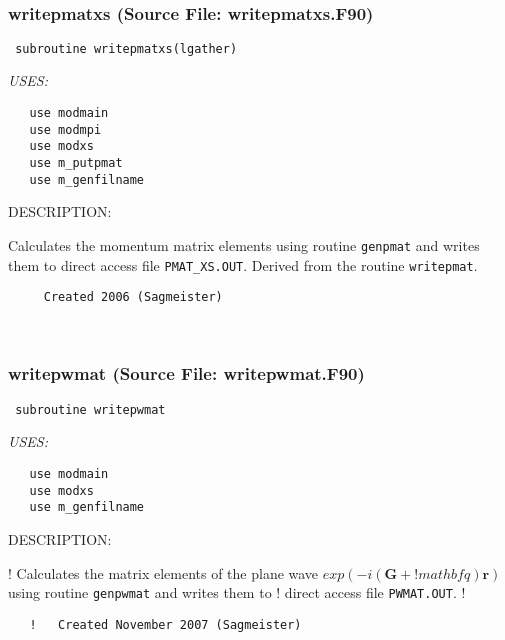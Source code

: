 \documentclass[11pt]{article}
\begin{document}

 
 
\mbox{}\hrulefill\ 
 
\subsubsection{writepmatxs (Source File: writepmatxs.F90)}


\begin{verbatim} subroutine writepmatxs(lgather)\end{verbatim}{\em USES:}
\begin{verbatim}   use modmain
   use modmpi
   use modxs
   use m_putpmat
   use m_genfilname\end{verbatim}
{\sf DESCRIPTION:\\ }


     Calculates the momentum matrix elements using routine {\tt genpmat} and
     writes them to direct access file {\tt PMAT\_XS.OUT}. Derived from
     the routine {\tt writepmat}.
  
\begin{verbatim}     Created 2006 (Sagmeister)\end{verbatim}


 
 
\mbox{}\hrulefill\ 
 
\subsubsection{writepwmat (Source File: writepwmat.F90)}


\begin{verbatim} subroutine writepwmat\end{verbatim}{\em USES:}
\begin{verbatim}   use modmain
   use modxs
   use m_genfilname\end{verbatim}
{\sf DESCRIPTION:\\ }


   !   Calculates the matrix elements of the plane wave $exp(-i(\mathbf{G}+
   !   mathbf{q})\mathbf{r})$ using routine {\tt genpwmat} and writes them to
   !   direct access file {\tt PWMAT.OUT}.
   !
\begin{verbatim}   !   Created November 2007 (Sagmeister)\end{verbatim}
\end{document}

